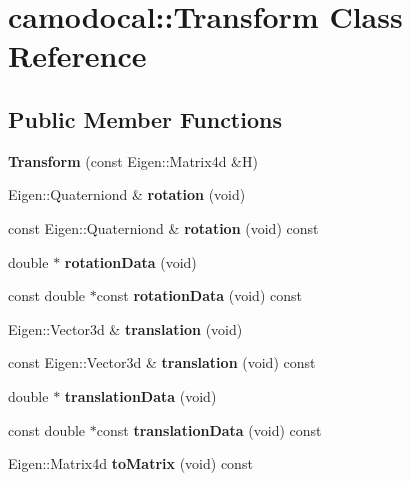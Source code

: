 \hypertarget{classcamodocal_1_1Transform}{}\section{camodocal\+:\+:Transform Class Reference}
\label{classcamodocal_1_1Transform}
\subsection*{Public Member Functions}
\begin{DoxyCompactItemize}
\item 
\mbox{\label{classcamodocal_1_1Transform_a264588b4d72b892b2f2463ae68671d08}} 
{\bfseries Transform} (const Eigen\+::\+Matrix4d \&H)
\item 
\mbox{\label{classcamodocal_1_1Transform_a32ae13270413ef9e200976ee9b4d85fb}} 
Eigen\+::\+Quaterniond \& {\bfseries rotation} (void)
\item 
\mbox{\label{classcamodocal_1_1Transform_a43376cec6a7c7414ef20595d86375259}} 
const Eigen\+::\+Quaterniond \& {\bfseries rotation} (void) const
\item 
\mbox{\label{classcamodocal_1_1Transform_a21c96a5c1d987e034bc37dbe4a509a02}} 
double $\ast$ {\bfseries rotation\+Data} (void)
\item 
\mbox{\label{classcamodocal_1_1Transform_ac7e273163fde43a4e97ecad635ab0b26}} 
const double $\ast$const {\bfseries rotation\+Data} (void) const
\item 
\mbox{\label{classcamodocal_1_1Transform_a242edb5919aec5d6c502579e73e27b98}} 
Eigen\+::\+Vector3d \& {\bfseries translation} (void)
\item 
\mbox{\label{classcamodocal_1_1Transform_a072eee9076ff756b011c3be01106fd89}} 
const Eigen\+::\+Vector3d \& {\bfseries translation} (void) const
\item 
\mbox{\label{classcamodocal_1_1Transform_aee53f4b5c60f3baba4dc128f5d1c26b6}} 
double $\ast$ {\bfseries translation\+Data} (void)
\item 
\mbox{\label{classcamodocal_1_1Transform_a1638980466511190d358c16c2ef39e49}} 
const double $\ast$const {\bfseries translation\+Data} (void) const
\item 
\mbox{\label{classcamodocal_1_1Transform_aeeec09c59758b1479efdb26b4227c13c}} 
Eigen\+::\+Matrix4d {\bfseries to\+Matrix} (void) const
\end{DoxyCompactItemize}


